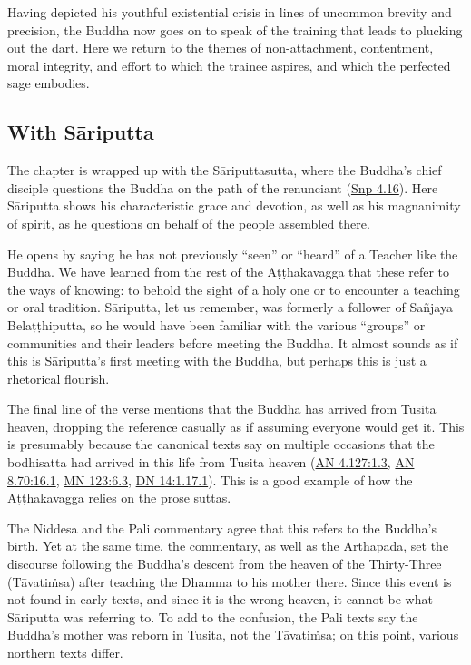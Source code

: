 \documentclass[12pt,openany]{book}%
\begin{document}
Having depicted his youthful existential crisis in lines of uncommon brevity and precision, the Buddha now goes on to speak of the training that leads to plucking out the dart. Here we return to the themes of non-attachment, contentment, moral integrity, and effort to which the trainee aspires, and which the perfected sage embodies.

\subsection*{With \textsanskrit{Sāriputta}}

The chapter is wrapped up with the \textsanskrit{Sāriputtasutta}, where the Buddha’s chief disciple questions the Buddha on the path of the renunciant (\href{https://suttacentral.net/snp4.16/en/sujato}{Snp 4.16}). Here \textsanskrit{Sāriputta} shows his characteristic grace and devotion, as well as his magnanimity of spirit, as he questions on behalf of the people assembled there.

He opens by saying he has not previously “seen” or “heard” of a Teacher like the Buddha. We have learned from the rest of the \textsanskrit{Aṭṭhakavagga} that these refer to the ways of knowing: to behold the sight of a holy one or to encounter a teaching or oral tradition. \textsanskrit{Sāriputta}, let us remember, was formerly a follower of \textsanskrit{Sañjaya} \textsanskrit{Belaṭṭhiputta}, so he would have been familiar with the various “groups” or communities and their leaders before meeting the Buddha. It almost sounds as if this is \textsanskrit{Sāriputta}’s first meeting with the Buddha, but perhaps this is just a rhetorical flourish.

The final line of the verse mentions that the Buddha has arrived from Tusita heaven, dropping the reference casually as if assuming everyone would get it. This is presumably because the canonical texts say on multiple occasions that the bodhisatta had arrived in this life from Tusita heaven (\href{https://suttacentral.net/an4.127/en/sujato\#1.3}{AN 4.127:1.3}, \href{https://suttacentral.net/an8.70/en/sujato\#16.1}{AN 8.70:16.1}, \href{https://suttacentral.net/mn123/en/sujato\#6.3}{MN 123:6.3}, \href{https://suttacentral.net/dn14/en/sujato\#1.17.1}{DN 14:1.17.1}). This is a good example of how the \textsanskrit{Aṭṭhakavagga} relies on the prose suttas.

The Niddesa and the Pali commentary agree that this refers to the Buddha’s birth. Yet at the same time, the commentary, as well as the Arthapada, set the discourse following the Buddha’s descent from the heaven of the Thirty-Three (\textsanskrit{Tāvatiṁsa}) after teaching the Dhamma to his mother there. Since this event is not found in early texts, and since it is the wrong heaven, it cannot be what \textsanskrit{Sāriputta} was referring to. To add to the confusion, the Pali texts say the Buddha’s mother was reborn in Tusita, not the \textsanskrit{Tāvatiṁsa}; on this point, various northern texts differ.
\end{document}
